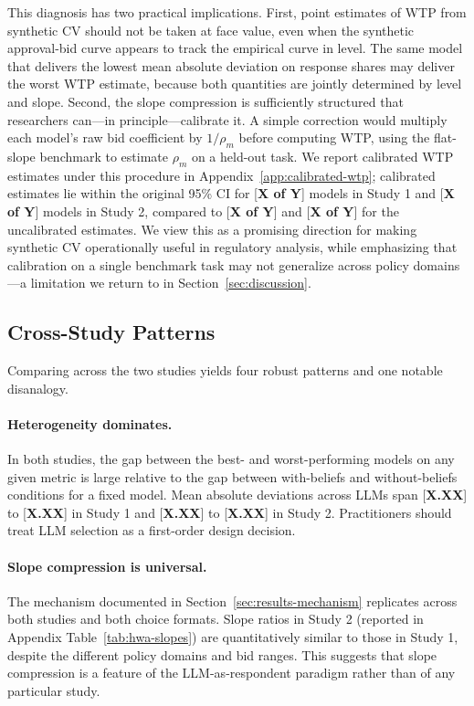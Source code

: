 \documentclass[12pt]{article}
\begin{document}
This diagnosis has two practical implications. First, point estimates of WTP from synthetic CV should not be taken at face value, even when the synthetic approval-bid curve appears to track the empirical curve in level. The same model that delivers the lowest mean absolute deviation on response shares may deliver the worst WTP estimate, because both quantities are jointly determined by level and slope. Second, the slope compression is sufficiently structured that researchers can---in principle---calibrate it. A simple correction would multiply each model's raw bid coefficient by $1/\rho_m$ before computing WTP, using the flat-slope benchmark to estimate $\rho_m$ on a held-out task. We report calibrated WTP estimates under this procedure in Appendix~\ref{app:calibrated-wtp}; calibrated estimates lie within the original 95\% CI for [\textbf{X of Y}] models in Study 1 and [\textbf{X of Y}] models in Study 2, compared to [\textbf{X of Y}] and [\textbf{X of Y}] for the uncalibrated estimates. We view this as a promising direction for making synthetic CV operationally useful in regulatory analysis, while emphasizing that calibration on a single benchmark task may not generalize across policy domains---a limitation we return to in Section~\ref{sec:discussion}.

\subsection{Cross-Study Patterns}\label{sec:results-cross}

Comparing across the two studies yields four robust patterns and one notable disanalogy.

\paragraph{Heterogeneity dominates.} In both studies, the gap between the best- and worst-performing models on any given metric is large relative to the gap between with-beliefs and without-beliefs conditions for a fixed model. Mean absolute deviations across LLMs span [\textbf{X.XX}] to [\textbf{X.XX}] in Study 1 and [\textbf{X.XX}] to [\textbf{X.XX}] in Study 2. Practitioners should treat LLM selection as a first-order design decision.

\paragraph{Slope compression is universal.} The mechanism documented in Section~\ref{sec:results-mechanism} replicates across both studies and both choice formats. Slope ratios in Study 2 (reported in Appendix Table~\ref{tab:hwa-slopes}) are quantitatively similar to those in Study 1, despite the different policy domains and bid ranges. This suggests that slope compression is a feature of the LLM-as-respondent paradigm rather than of any particular study.
\end{document}
